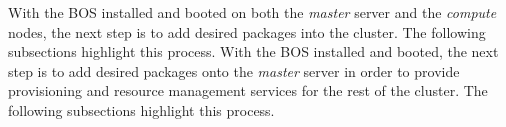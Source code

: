 With the BOS installed and booted on both the {\em master} server and the {\em
compute} nodes, the next step is to add desired \OHPC{} packages into the
cluster. The following subsections highlight this process.
\else
With the BOS installed and booted, the next step is to add desired \OHPC{} packages
onto the {\em master} server in order to provide provisioning and resource
management services for the rest of the cluster. The following subsections
highlight this process.
\fi
